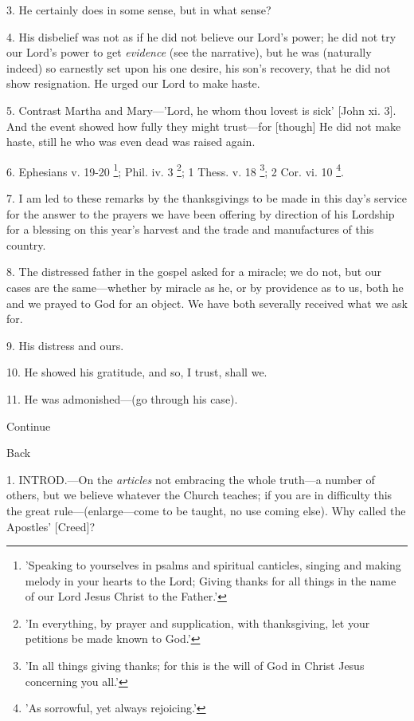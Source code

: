 3. He certainly does in some sense, but in what
sense?

4. His disbelief was not as if he did not believe
our Lord's power; he did not try our Lord's power to get \emph{evidence}
(see the narrative), but he was (naturally indeed) so earnestly set
upon his one desire, his son's recovery, that he did not show
resignation. He urged our Lord to make haste.

5. Contrast Martha and Mary—'Lord, he whom thou
lovest is sick' [John xi. 3]. And the event showed how fully they
might trust—for [though] He did not make haste, still he who was
even dead was raised again.

6. Ephesians v. 19-20 \footnote{'Speaking to yourselves
in psalms and spiritual canticles, singing and making melody in your
hearts to the Lord; Giving thanks for all things in the name of our
Lord Jesus Christ to the Father.'}; Phil. iv. 3 \footnote{'In everything, by
prayer and supplication, with thanksgiving, let your petitions be made
known to God.'};
1 Thess. v. 18 \footnote{'In all things giving
thanks; for this is the will of God in Christ Jesus concerning you
all.'}; 2 Cor.
vi. 10 \footnote{'As sorrowful, yet
always rejoicing.'}.

7. I am led to these remarks by the thanksgivings
to be made in this day's service for the answer to the prayers we have
been offering by direction of his Lordship for a blessing on this year's
harvest and the trade and manufactures of this country.

8. The distressed father in the gospel asked for
a miracle; we do not, but our cases are the same—whether by miracle
as he, or by providence as to us, both he and we prayed to God for an
object. We have both severally received what we ask for.

9. His distress and ours.

10. He showed his gratitude, and so, I trust,
shall we.

11. He was admonished—(go through his case).

Continue


Back


1. INTROD.—On
the \emph{articles} not embracing the whole truth—a number of
others, but we believe whatever the Church teaches; if you are in
difficulty this the great rule—(enlarge—come to be taught, no use
coming else). Why called the Apostles' [Creed]?

